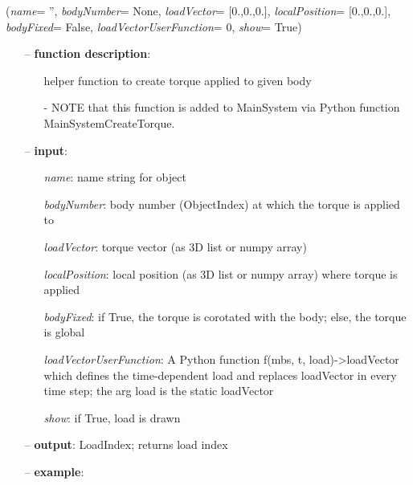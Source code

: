 \ei

%
\begin{flushleft}
\label{sec:mainsystemextensions:CreateTorque}
({\it name}= '', {\it bodyNumber}= None, {\it loadVector}= [0.,0.,0.], {\it localPosition}= [0.,0.,0.], {\it bodyFixed}= False, {\it loadVectorUserFunction}= 0, {\it show}= True)
\end{flushleft}
\setlength{\itemindent}{0.7cm}
\begin{itemize}[leftmargin=0.7cm]
\item[--]
{\bf function description}: \vspace{-6pt}
\begin{itemize}[leftmargin=1.2cm]
\setlength{\itemindent}{-0.7cm}
\item[]helper function to create torque applied to given body
\item[]- NOTE that this function is added to MainSystem via Python function MainSystemCreateTorque.
\end{itemize}
\item[--]
{\bf input}: \vspace{-6pt}
\begin{itemize}[leftmargin=1.2cm]
\setlength{\itemindent}{-0.7cm}
\item[]{\it name}: name string for object
\item[]{\it bodyNumber}: body number (ObjectIndex) at which the torque is applied to
\item[]{\it loadVector}: torque vector (as 3D list or numpy array)
\item[]{\it localPosition}: local position (as 3D list or numpy array) where torque is applied
\item[]{\it bodyFixed}: if True, the torque is corotated with the body; else, the torque is global
\item[]{\it loadVectorUserFunction}: A Python function f(mbs, t, load)->loadVector which defines the time-dependent load and replaces loadVector in every time step; the arg load is the static loadVector
\item[]{\it show}: if True, load is drawn
\end{itemize}
\item[--]
{\bf output}: LoadIndex; returns load index
\item[--]
{\bf example}: \vspace{-12pt}\ei\begin{lstlisting}[language=Python, xleftmargin=36pt]

\end{lstlisting}
\end{itemize}

